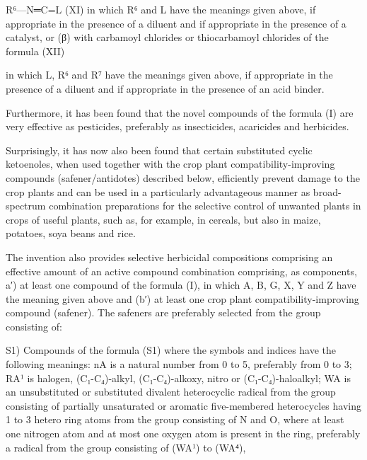 \documentclass[11pt,a4paper]{article}
\begin{document}
R⁶—N═C=L (XI) in which R⁶ and L have the meanings given above, if appropriate in the presence of a diluent and if appropriate in the presence of a catalyst, or (β) with carbamoyl chlorides or thiocarbamoyl chlorides of the formula (XII)

in which L, R⁶ and R⁷ have the meanings given above, if appropriate in the presence of a diluent and if appropriate in the presence of an acid binder.

Furthermore, it has been found that the novel compounds of the formula (I) are very effective as pesticides, preferably as insecticides, acaricides and herbicides.

Surprisingly, it has now also been found that certain substituted cyclic ketoenoles, when used together with the crop plant compatibility-improving compounds (safener/antidotes) described below, efficiently prevent damage to the crop plants and can be used in a particularly advantageous manner as broad-spectrum combination preparations for the selective control of unwanted plants in crops of useful plants, such as, for example, in cereals, but also in maize, potatoes, soya beans and rice.

The invention also provides selective herbicidal compositions comprising an effective amount of an active compound combination comprising, as components, a′) at least one compound of the formula (I), in which A, B, G, X, Y and Z have the meaning given above and (b′) at least one crop plant compatibility-improving compound (safener). The safeners are preferably selected from the group consisting of:

S1) Compounds of the formula (S1) where the symbols and indices have the following meanings: nA is a natural number from 0 to 5, preferably from 0 to 3; RA¹ is halogen, (C₁-C₄)-alkyl, (C₁-C₄)-alkoxy, nitro or (C₁-C₄)-haloalkyl; WA is an unsubstituted or substituted divalent heterocyclic radical from the group consisting of partially unsaturated or aromatic five-membered heterocycles having 1 to 3 hetero ring atoms from the group consisting of N and O, where at least one nitrogen atom and at most one oxygen atom is present in the ring, preferably a radical from the group consisting of (WA¹) to (WA⁴),
\end{document}
